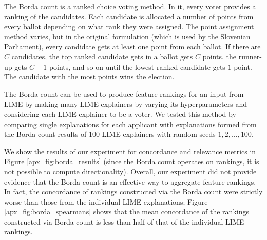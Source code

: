 \documentclass[mnsc,blindrev]{informs3}
\begin{document}
            The Borda count is a ranked choice voting method. In it, every voter provides a ranking of the candidates. Each candidate is allocated a number of points from every ballot depending on what rank they were assigned. The point assignment method varies, but in the original formulation (which is used by the Slovenian Parliament), every candidate gets at least one point from each ballot. If there are $C$ candidates, the top ranked candidate gets in a ballot gets $C$ points, the runner-up gets $C-1$ points, and so on until the lowest ranked candidate gets $1$ point. The candidate with the most points wins the election.

            The Borda count can be used to produce feature rankings for an input from LIME by making many LIME explainers by varying its hyperparameters and considering each LIME explainer to be a voter. We tested this method by comparing single explanations for each applicant with explanations formed from the Borda count results of 100 LIME explainers with random seeds $1,2,\ldots,100$.
            
             We show the results of our experiment for concordance and relevance metrics in Figure \ref{apx_fig:borda_results} (since the Borda count operates on rankings, it is not possible to compute directionality). Overall, our experiment did not provide evidence that the Borda count is an effective way to aggregate feature rankings. In fact, the concordance of rankings constructed via the Borda count were strictly worse than those from the individual LIME explanations; Figure \ref{apx_fig:borda_spearmans} shows that the mean concordance of the rankings constructed via Borda count is less than half of that of the individual LIME rankings.
\end{document}
